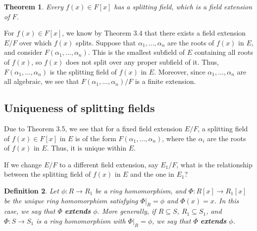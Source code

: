 \documentclass[10pt]{article}
\makeatletter
\theoremstyle{newstyle}
\newtheorem{thm}{Theorem}[section]
\newtheorem{defn}[thm]{Definition}
\newenvironment{pf}[1][\proofname]{\par
  \pushQED{\qed}%
  \normalfont \topsep0\p@\relax
  \trivlist
  \item[\hskip\labelsep\scshape
  #1\@addpunct{.}]\ignorespaces
}{%
  \popQED\endtrivlist\@endpefalse
}
\makeatother
\begin{document}
\begin{thm}
Every $f(x) \in F[x]$ has a splitting field, which is a field extension of $F$. 
\end{thm}
\begin{pf}
For $f(x) \in F[x]$, we know by Theorem 3.4 that there exists a field extension $E/F$ 
over which $f(x)$ splits. Suppose that $\alpha_1, \dots, \alpha_n$ are the roots of $f(x)$ in $E$, 
and consider $F(\alpha_1, \dots, \alpha_n)$. This is the smallest subfield of $E$ containing all 
roots of $f(x)$, so $f(x)$ does not split over any proper subfield of it. Thus, 
$F(\alpha_1, \dots, \alpha_n)$ is the splitting field of $f(x)$ in $E$. Moreover, 
since $\alpha_1, \dots, \alpha_n$ are all algebraic, we see that 
$F(\alpha_1, \dots, \alpha_n)/F$ is a finite extension. 
\end{pf}

\subsection{Uniqueness of splitting fields}
Due to Theorem 3.5, we see that for a fixed field extension $E/F$, a splitting field 
of $f(x) \in F[x]$ in $E$ is of the form $F(\alpha_1, \dots, \alpha_n)$, where the 
$\alpha_i$ are the roots of $f(x)$ in $E$. Thus, it is unique within $E$. 

If we change $E/F$ to a different field extension, say $E_1/F$, what is the relationship 
between the splitting field of $f(x)$ in $E$ and the one in $E_1$?

\begin{defn}
Let $\phi : R \to R_1$ be a ring homomorphism, and $\Phi : R[x] \to R_1[x]$ be the unique 
ring homomorphism satisfying $\Phi|_R = \phi$ and $\Phi(x) = x$. In this case, we say that 
$\Phi$ {\bf extends} $\phi$. 
More generally, if $R \subseteq S$, $R_1 \subseteq S_1$, and $\Phi : S \to S_1$ is a ring 
homomorphism with $\Phi|_R = \phi$, we say that $\Phi$ {\bf extends} $\phi$.
\end{defn}
\end{document}
